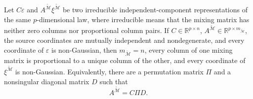 Let \(C\varepsilon\) and \(A^{\widetilde{\mathcal M}}\xi^{\widetilde{\mathcal M}}\) be two irreducible independent-component representations of the same \(p\)-dimensional law, where irreducible means that the mixing matrix has neither zero columns nor proportional column pairs. If \(C\in\mathbb R^{p\times n}\), \(A^{\widetilde{\mathcal M}}\in\mathbb R^{p\times m_{\widetilde{\mathcal M}}}\), the source coordinates are mutually independent and nondegenerate, and every coordinate of \(\varepsilon\) is non-Gaussian, then \(m_{\widetilde{\mathcal M}}=n\), every column of one mixing matrix is proportional to a unique column of the other, and every coordinate of \(\xi^{\widetilde{\mathcal M}}\) is non-Gaussian. Equivalently, there are a permutation matrix \(\Pi\) and a nonsingular diagonal matrix \(D\) such that
\[
 A^{\widetilde{\mathcal M}}=C\Pi D.
\]
